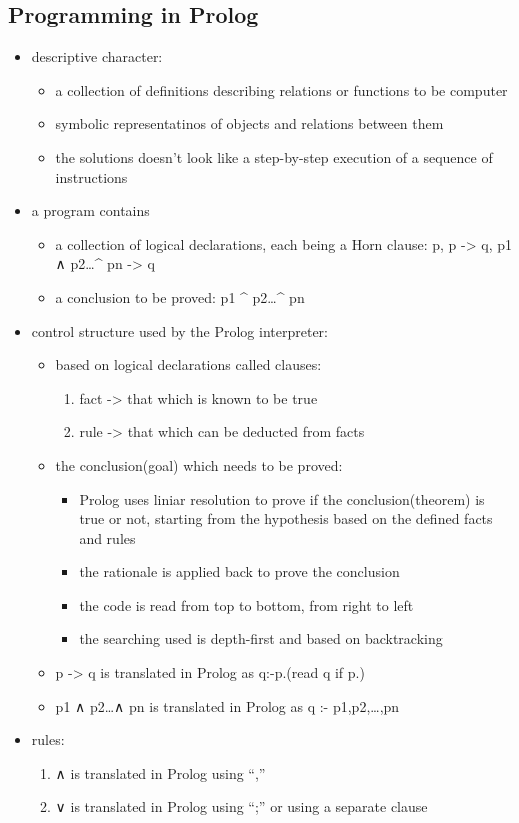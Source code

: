 \documentclass[11pt]{article}
\begin{document}
\subsection{Programming in Prolog}
\label{sec:org82213c2}
\begin{itemize}
\item descriptive character:
\begin{itemize}
\item a collection of definitions describing relations or functions to be computer
\item symbolic representatinos of objects and relations between them
\item the solutions doesn't look like a step-by-step execution of a sequence of instructions
\end{itemize}
\item a program contains
\begin{itemize}
\item a collection of logical declarations, each being a Horn clause: p, p -> q, p1 ∧ p2\ldots{}\^{} pn -> q
\item a conclusion to be proved: p1 \^{} p2\ldots{}\^{} pn
\end{itemize}
\item control structure used by the Prolog interpreter:
\begin{itemize}
\item based on logical declarations called clauses:
\begin{enumerate}
\item fact -> that which is known to be true
\item rule -> that which can be deducted from facts
\end{enumerate}
\item the conclusion(goal) which needs to be proved:
\begin{itemize}
\item Prolog uses liniar resolution to prove if the conclusion(theorem) is true or not, starting from the hypothesis based on the defined facts and rules
\item the rationale is applied back to prove the conclusion
\item the code is read from top to bottom, from right to left
\item the searching used is depth-first and based on backtracking
\end{itemize}
\item p -> q is translated in Prolog as q:-p.(read q if p.)
\item p1 ∧ p2\ldots{}∧ pn is translated in Prolog as q :- p1,p2,\ldots{},pn
\end{itemize}
\item rules:
\begin{enumerate}
\item ∧ is translated in Prolog using ``,''
\item ∨ is translated in Prolog using ``;'' or using a separate clause
\end{enumerate}
\end{itemize}
\end{document}
